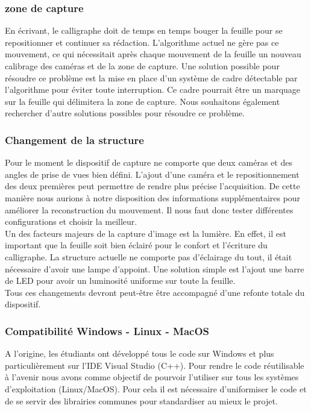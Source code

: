 \documentclass{article}
\begin{document}
\subsubsection{zone de capture}

En écrivant, le calligraphe doit de temps en temps bouger la feuille pour se repositionner et continuer sa rédaction. L'algorithme actuel ne gère pas ce mouvement, ce qui nécessitait après chaque mouvement de la feuille un nouveau calibrage des caméras et de la zone de capture. Une solution possible pour résoudre ce problème est la mise en place d'un système de cadre détectable par l'algorithme pour éviter toute interruption. Ce cadre pourrait être un marquage sur la feuille qui délimitera la zone de capture. Nous souhaitons également rechercher d'autre solutions possibles pour résoudre ce problème.

\subsubsection{Changement de la structure}

Pour le moment le dispositif de capture ne comporte que deux caméras et des angles de prise de vues bien défini. L'ajout d'une caméra et le repositionnement des deux premières peut permettre de rendre plus précise l'acquisition. De cette manière nous aurions à notre disposition des informations supplémentaires pour améliorer la reconstruction du mouvement. Il nous faut donc tester différentes configurations et choisir la meilleur. \\

Un des facteurs majeurs de la capture d'image est la lumière. En effet, il est important que la feuille soit bien éclairé pour le confort et l'écriture du calligraphe. La structure actuelle ne comporte pas d'éclairage du tout, il était nécessaire d'avoir une lampe d’appoint. Une solution simple est l'ajout une barre de LED pour avoir un luminosité uniforme sur toute la feuille. \\

Tous ces changements devront peut-être être accompagné d'une refonte totale du dispositif.

\subsubsection{Compatibilité Windows - Linux - MacOS}

A l'origine, les étudiants ont développé tous le code sur Windows et plus particulièrement sur l'IDE Visual Studio (C++). Pour rendre le code réutilisable à l'avenir nous avons comme objectif de pourvoir l'utiliser sur tous les systèmes d'exploitation (Linux/MacOS). Pour cela il est nécessaire d'uniformiser le code et de se servir des librairies communes pour standardiser au mieux le projet.
\end{document}
